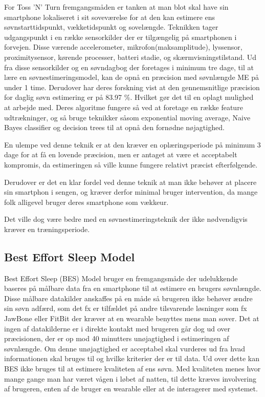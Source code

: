 For Toss 'N' Turn fremgangsmåden er tanken at man blot skal have sin smartphone lokaliseret i sit soveværelse for at den kan estimere ens søvnstarttidspunkt, vækketidspunkt og sovelængde.
Teknikken tager udgangspunkt i en række sensorkilder der er tilgængelig på smartphonen i forvejen.
Disse værende accelerometer, mikrofon(maksamplitude), lyssensor, proximitysensor, kørende processer, batteri stadie, og skærmvisningstilstand.
Ud fra disse sensorkilder og en søvndagbog der foretages i minimum tre dage, til at lære en søvnestimeringsmodel, kan de opnå en præcision med søvnlængde ME på under 1 time.
Derudover har deres forskning vist at den gennemsnitlige præcision for daglig søvn estimering er på 83.97 \%. Hvilket gør det til en oplagt mulighed at arbejde med.
Deres algoritme fungere så ved at foretage en række feature udtrækninger, og så bruge teknikker såsom exponential moving average, Naive Bayes classifier og decision trees til at opnå den fornødne nøjagtighed.

En ulempe ved denne teknik er at den kræver en oplæringsperiode på minimum 3 dage for at få en lovende præcision, men er antaget at være et acceptabelt kompromis, da estimeringen så ville kunne fungere relativt præcist efterfølgende.

Derudover er det en klar fordel ved denne teknik at man ikke behøver at placere sin smartphon i sengen, og kræver derfor minimal bruger intervention, da mange folk alligevel bruger deres smartphone som vækkeur.

Det ville dog være bedre med en søvnestimeringsteknik der ikke nødvendigvis kræver en træningsperiode.

\subsection{Best Effort Sleep Model}\label{sec:BES}
Best Effort Sleep (BES) Model \citep{6563918} bruger en fremgangsmåde der udelukkende baseres på målbare data fra en smartphone til at estimere en brugers søvnlængde.
Disse målbare datakilder anskaffes på en måde så brugeren ikke behøver ændre sin søvn adfærd, som det fx er tilfældet på andre tilsvarende løsninger som fx JawBone eller FitBit der kræver at en wearable benyttes mens man sover.
Det at ingen af datakilderne er i direkte kontakt med brugeren går dog ud over præcisionen, der er op mod 40 minutters unøjagtighed i estimeringen af søvnlængde.
Om denne unøjagtighed er acceptabel skal vurderes ud fra hvad informationen skal bruges til og hvilke kriterier der er til data.
Ud over dette kan BES ikke bruges til at estimere kvaliteten af ens søvn.
Med kvaliteten menes hvor mange gange man har været vågen i løbet af natten, til dette kræves involvering af brugeren, enten af de bruger en wearable eller at de interagerer med systemet.

